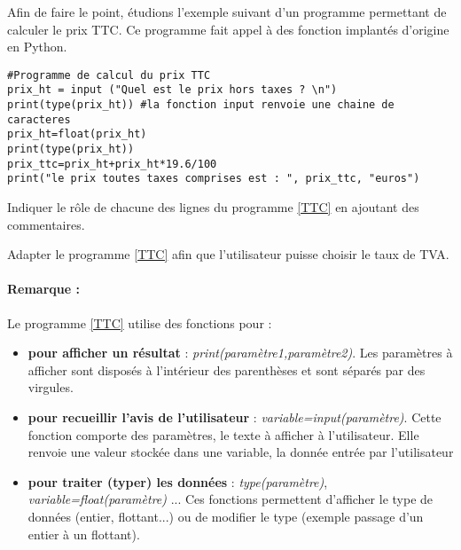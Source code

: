 Afin de faire le  point, étudions l'exemple suivant d'un programme permettant de calculer le prix TTC. Ce programme fait appel à des fonction implantés d'origine en Python. 

\begin{lstlisting}[frame=lines, float=ht,caption={Calcul du prix TTC},label=TTC]
#Programme de calcul du prix TTC
prix_ht = input ("Quel est le prix hors taxes ? \n")
print(type(prix_ht)) #la fonction input renvoie une chaine de caracteres
prix_ht=float(prix_ht)
print(type(prix_ht))
prix_ttc=prix_ht+prix_ht*19.6/100
print("le prix toutes taxes comprises est : ", prix_ttc, "euros")

\end{lstlisting}

\begin{Exercise}[title={Commenter},counter={exo}]
	Indiquer le rôle de chacune des lignes du programme \ref{TTC} en ajoutant des commentaires.
\end{Exercise}
 
\begin{Exercise}[title={Modifier},counter={exo}]
	Adapter le programme \ref{TTC} afin que l'utilisateur puisse choisir le taux de TVA.
\end{Exercise}



\paragraph{Remarque : } 

Le programme \ref{TTC} utilise des fonctions pour :
\begin{itemize}
	\item \textbf{pour afficher un résultat}  : \textit{print(paramètre1,paramètre2)}. Les paramètres à afficher sont disposés à l'intérieur des parenthèses et sont séparés par des virgules.
	\item \textbf{pour recueillir l'avis de l'utilisateur} : \textit{variable=input(paramètre)}. Cette fonction comporte des paramètres, le texte à afficher à l'utilisateur. Elle renvoie une valeur stockée dans une variable, la donnée entrée par l'utilisateur
	\item \textbf{pour traiter (typer) les données} : \textit{type(paramètre)}, \textit{variable=float(paramètre)} ... Ces fonctions permettent d'afficher le type de données (entier, flottant...) ou de modifier le type (exemple passage d'un entier à un flottant).
\end{itemize}

